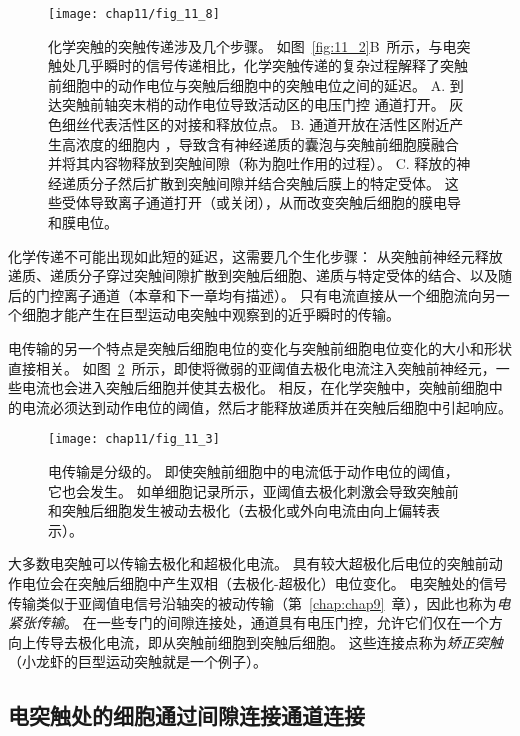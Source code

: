 \begin{figure}[htbp]
	\centering
	\texttt{[image: chap11/fig\_11\_8]}
	\caption{化学突触的突触传递涉及几个步骤。
		如图~\ref{fig:11_2}B~所示，与电突触处几乎瞬时的信号传递相比，化学突触传递的复杂过程解释了突触前细胞中的动作电位与突触后细胞中的突触电位之间的延迟。
		A. 到达突触前轴突末梢的动作电位导致活动区的电压门控  通道打开。
		灰色细丝代表活性区的对接和释放位点。
		B.  通道开放在活性区附近产生高浓度的细胞内 ，导致含有神经递质的囊泡与突触前细胞膜融合并将其内容物释放到突触间隙（称为胞吐作用的过程）。
		C. 释放的神经递质分子然后扩散到突触间隙并结合突触后膜上的特定受体。
		这些受体导致离子通道打开（或关闭），从而改变突触后细胞的膜电导和膜电位。}
	\label{fig:11_8}
\end{figure}


化学传递不可能出现如此短的延迟，这需要几个生化步骤：
从突触前神经元释放递质、递质分子穿过突触间隙扩散到突触后细胞、递质与特定受体的结合、以及随后的门控离子通道（本章和下一章均有描述）。
只有电流直接从一个细胞流向另一个细胞才能产生在巨型运动电突触中观察到的近乎瞬时的传输。


电传输的另一个特点是突触后细胞电位的变化与突触前细胞电位变化的大小和形状直接相关。
如图~\ref{fig:11_3}~所示，即使将微弱的亚阈值去极化电流注入突触前神经元，一些电流也会进入突触后细胞并使其去极化。
相反，在化学突触中，突触前细胞中的电流必须达到动作电位的阈值，然后才能释放递质并在突触后细胞中引起响应。


\begin{figure}[htbp]
	\centering
	\texttt{[image: chap11/fig\_11\_3]}
	\caption{电传输是分级的。
		即使突触前细胞中的电流低于动作电位的阈值，它也会发生。
		如单细胞记录所示，亚阈值去极化刺激会导致突触前和突触后细胞发生被动去极化（去极化或外向电流由向上偏转表示）。}
	\label{fig:11_3}
\end{figure}


大多数电突触可以传输去极化和超极化电流。
具有较大超极化后电位的突触前动作电位会在突触后细胞中产生双相（去极化-超极化）电位变化。
电突触处的信号传输类似于亚阈值电信号沿轴突的被动传输（第~\ref{chap:chap9}~章），因此也称为\textit{电紧张传输}。
在一些专门的间隙连接处，通道具有电压门控，允许它们仅在一个方向上传导去极化电流，即从突触前细胞到突触后细胞。
这些连接点称为\textit{矫正突触}
（小龙虾的巨型运动突触就是一个例子）。



\subsection{电突触处的细胞通过间隙连接通道连接}

